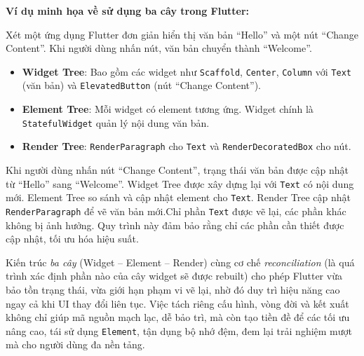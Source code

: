 \documentclass[../DoAn.tex]{subfiles}
\numberwithin{figure}{chapter}
\begin{document}
\textbf{Ví dụ minh họa về sử dụng ba cây trong Flutter:}

Xét một ứng dụng Flutter đơn giản hiển thị văn bản ``Hello'' và một nút ``Change Content''. Khi người dùng nhấn nút, văn bản chuyển thành ``Welcome''.

\begin{itemize}
    \item \textbf{Widget Tree}: Bao gồm các widget như \texttt{Scaffold}, \texttt{Center}, \texttt{Column} với \texttt{Text} (văn bản) và \texttt{ElevatedButton} (nút ``Change Content'').
    \item \textbf{Element Tree}: Mỗi widget có element tương ứng. Widget chính là \texttt{StatefulWidget} quản lý nội dung văn bản.
    \item \textbf{Render Tree}: \texttt{RenderParagraph} cho \texttt{Text} và \texttt{RenderDecoratedBox} cho nút.
\end{itemize}

Khi người dùng nhấn nút ``Change Content'', trạng thái văn bản được cập nhật từ ``Hello'' sang ``Welcome''. Widget Tree được xây dựng lại với \texttt{Text} có nội dung mới. Element Tree so sánh và cập nhật element cho \texttt{Text}. Render Tree cập nhật \texttt{RenderParagraph} để vẽ văn bản mới.Chỉ phần \texttt{Text} được vẽ lại, các phần khác không bị ảnh hưởng. Quy trình này đảm bảo rằng chỉ các phần cần thiết được cập nhật, tối ưu hóa hiệu suất.

Kiến trúc \emph{ba cây} (Widget – Element – Render) cùng cơ chế \emph{reconciliation} (là quá trình xác định phần nào của cây widget sẽ được rebuilt) cho phép Flutter vừa bảo tồn trạng thái, vừa giới hạn phạm vi vẽ lại, nhờ đó duy trì hiệu năng cao ngay cả khi UI thay đổi liên tục.  
Việc tách riêng cấu hình, vòng đời và kết xuất không chỉ giúp mã nguồn mạch lạc, dễ bảo trì, mà còn tạo tiền đề để các tối ưu nâng cao, tái sử dụng \texttt{Element}, tận dụng bộ nhớ đệm, đem lại trải nghiệm mượt mà cho người dùng đa nền tảng.
\end{document}
